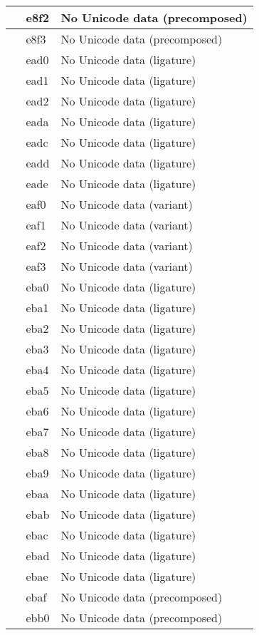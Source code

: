 \documentclass[12pt,letterpaper,openany]{book}
\begin{document}
\begin{center}
\begin{supertabular}{|m{0.25in}|m{0.5in}|m{4in}|}
			 & e8f2 & No Unicode data (precomposed)\\\hline
			 & e8f3 & No Unicode data (precomposed)\\\hline
			 & ead0 & No Unicode data (ligature)\\\hline
			 & ead1 & No Unicode data (ligature)\\\hline
			 & ead2 & No Unicode data (ligature)\\\hline
			 & eada & No Unicode data (ligature)\\\hline
			 & eadc & No Unicode data (ligature)\\\hline
			 & eadd & No Unicode data (ligature)\\\hline
			 & eade & No Unicode data (ligature)\\\hline
			 & eaf0 & No Unicode data (variant)\\\hline
			 & eaf1 & No Unicode data (variant)\\\hline
			 & eaf2 & No Unicode data (variant)\\\hline
			 & eaf3 & No Unicode data (variant)\\\hline
			 & eba0 & No Unicode data (ligature)\\\hline
			 & eba1 & No Unicode data (ligature)\\\hline
			 & eba2 & No Unicode data (ligature)\\\hline
			 & eba3 & No Unicode data (ligature)\\\hline
			 & eba4 & No Unicode data (ligature)\\\hline
			 & eba5 & No Unicode data (ligature)\\\hline
			 & eba6 & No Unicode data (ligature)\\\hline
			 & eba7 & No Unicode data (ligature)\\\hline
			 & eba8 & No Unicode data (ligature)\\\hline
			 & eba9 & No Unicode data (ligature)\\\hline
			 & ebaa & No Unicode data (ligature)\\\hline
			 & ebab & No Unicode data (ligature)\\\hline
			 & ebac & No Unicode data (ligature)\\\hline
			 & ebad & No Unicode data (ligature)\\\hline
			 & ebae & No Unicode data (ligature)\\\hline
			 & ebaf & No Unicode data (precomposed)\\\hline
			 & ebb0 & No Unicode data (precomposed)\\\hline

\end{supertabular}
\end{center}
\end{document}
